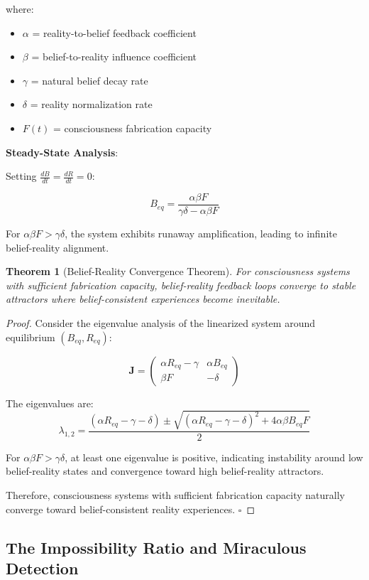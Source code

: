 \documentclass[12pt,a4paper]{article}
\newtheorem{theorem}{Theorem}[section]
\begin{document}
where:
\begin{itemize}
\item $\alpha$ = reality-to-belief feedback coefficient
\item $\beta$ = belief-to-reality influence coefficient  
\item $\gamma$ = natural belief decay rate
\item $\delta$ = reality normalization rate
\item $F(t)$ = consciousness fabrication capacity
\end{itemize}

\textbf{Steady-State Analysis}:

Setting $\frac{dB}{dt} = \frac{dR}{dt} = 0$:

$$B_{eq} = \frac{\alpha \beta F}{\gamma \delta - \alpha \beta F}$$

For $\alpha \beta F > \gamma \delta$, the system exhibits runaway amplification, leading to infinite belief-reality alignment.

\begin{theorem}[Belief-Reality Convergence Theorem]
For consciousness systems with sufficient fabrication capacity, belief-reality feedback loops converge to stable attractors where belief-consistent experiences become inevitable.
\end{theorem}

\begin{proof}
Consider the eigenvalue analysis of the linearized system around equilibrium $(B_{eq}, R_{eq})$:

$$\mathbf{J} = \begin{pmatrix}
\alpha R_{eq} - \gamma & \alpha B_{eq} \\
\beta F & -\delta
\end{pmatrix}$$

The eigenvalues are:
$$\lambda_{1,2} = \frac{(\alpha R_{eq} - \gamma - \delta) \pm \sqrt{(\alpha R_{eq} - \gamma - \delta)^2 + 4\alpha \beta B_{eq} F}}{2}$$

For $\alpha \beta F > \gamma \delta$, at least one eigenvalue is positive, indicating instability around low belief-reality states and convergence toward high belief-reality attractors.

Therefore, consciousness systems with sufficient fabrication capacity naturally converge toward belief-consistent reality experiences. $\square$
\end{proof}

\subsection{The Impossibility Ratio and Miraculous Detection}
\end{document}
